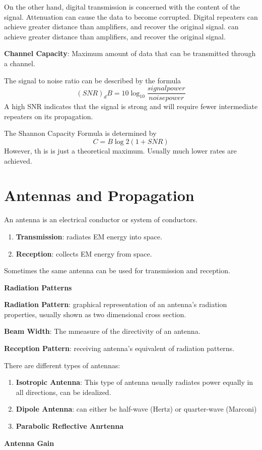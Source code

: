 \documentclass{article}
\begin{document}
On the other hand, digital transmission is concerned with the content of the signal. Attenuation can cause the data to become 
corrupted. Digital repeaters  can achieve greater distance than amplifiers, and recover the original signal. can achieve greater distance than amplifiers, and recover the original signal.

	\textbf{Channel Capacity}: Maximum amount of data that can be transmitted through a channel. 

The signal to noise ratio can be described by the formula
				$$(SNR)_dB = 10\log_{10} \frac{signal power}{noise power} $$
A high SNR indicates that the signal is strong and will require fewer intermediate repeaters on its propagation.

The Shannon Capacity Formula is determined by
				$$C = B\log{2}(1+SNR)$$
However, th is is just a theoretical maximum. Usually much lower rates are achieved.

\newpage
\section{Antennas and Propagation}

An antenna is an electrical conductor or system of conductors.
\begin{enumerate}
		\item{\textbf{Transmission}}: radiates EM energy into space.
		\item{\textbf{Reception}}: collects EM energy from space.
\end{enumerate}

Sometimes the same antenna can be used for transmission and reception.

\hspace{10mm}\textbf{Radiation Patterns}

\textbf{Radiation Pattern}: graphical representation of an antenna's radiation properties, usually shown as two dimensional cross
section.

\textbf{Beam Width}: The mmeasure of the directivity of an antenna.

\textbf{Reception Pattern}: receiving antenna's equivalent of radiation patterns.

There are different types of antennas:
\begin{enumerate}
		\item{\textbf{Isotropic Antenna}}: This type of antenna usually radiates power equally in all directions,
				can be idealized.

		\item{\textbf{Dipole Antenna}}: can either be half-wave (Hertz) or quarter-wave (Marconi)

		\item{\textbf{Parabolic Reflective Anrtenna}}

\end{enumerate}
\hspace{10mm}\textbf{Antenna Gain}
\end{document}
